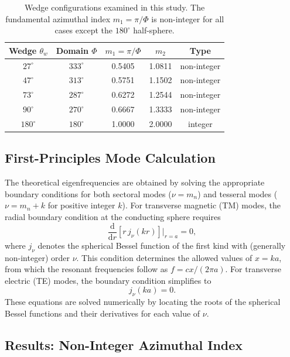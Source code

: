 \documentclass[
  aip,
  amsmath,amssymb,
  preprint
]{revtex4-1}
\begin{document}
\begin{table}[htbp]
\centering
\caption{Wedge configurations examined in this study. The fundamental azimuthal index $m_1 = \pi/\Phi$ is non-integer for all cases except the $180^\circ$ half-sphere.}
\label{tab:configurations}
\begin{tabular}{ccccc}
\hline
Wedge $\theta_w$ & Domain $\Phi$ & $m_1 = \pi/\Phi$ & $m_2$ & Type \\
\hline
$27^\circ$ & $333^\circ$ & 0.5405 & 1.0811 & non-integer \\
$47^\circ$ & $313^\circ$ & 0.5751 & 1.1502 & non-integer \\
$73^\circ$ & $287^\circ$ & 0.6272 & 1.2544 & non-integer \\
$90^\circ$ & $270^\circ$ & 0.6667 & 1.3333 & non-integer \\
$180^\circ$ & $180^\circ$ & 1.0000 & 2.0000 & integer \\
\hline
\end{tabular}
\end{table}

\subsection{First-Principles Mode Calculation}

The theoretical eigenfrequencies are obtained by solving the appropriate boundary conditions for both sectoral modes ($\nu = m_n$) and tesseral modes ($\nu = m_n + k$ for positive integer $k$). For transverse magnetic (TM) modes, the radial boundary condition at the conducting sphere requires
\begin{equation}
\frac{\mathrm{d}}{\mathrm{d}r}\left[r \, j_\nu(kr)\right]\bigg|_{r=a} = 0,
\label{eq:TM_BC}
\end{equation}
where $j_\nu$ denotes the spherical Bessel function of the first kind with (generally non-integer) order $\nu$. This condition determines the allowed values of $x = ka$, from which the resonant frequencies follow as $f = cx/(2\pi a)$. For transverse electric (TE) modes, the boundary condition simplifies to
\begin{equation}
j_\nu(ka) = 0.
\label{eq:TE_BC}
\end{equation}
These equations are solved numerically by locating the roots of the spherical Bessel functions and their derivatives for each value of $\nu$.

\subsection{Results: Non-Integer Azimuthal Index}
\end{document}
